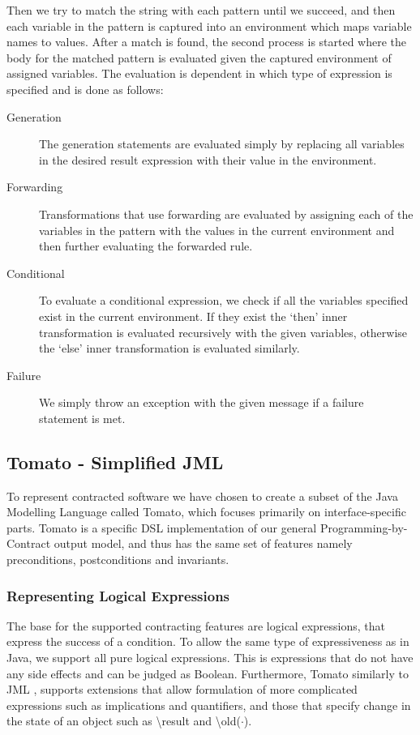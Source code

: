Then we try to match the string with each pattern until we succeed,
and then each variable in the pattern is captured into an environment
which maps variable names to values.
After a match is found, the second process is started where the body
for the matched pattern is evaluated given the captured environment of assigned variables.
The evaluation is dependent in which type of expression is specified
and is done as follows:

\begin{description}
  \item[Generation] The generation statements are evaluated simply
    by replacing all variables in the desired result expression with their 
    value in the environment. 
  \item[Forwarding] Transformations that use forwarding are evaluated by
    assigning each of the variables in the pattern with the values in the
    current environment and then further evaluating the forwarded rule.
  \item[Conditional] To evaluate a conditional expression, we check if all
    the variables specified exist in the current environment.
    If they exist the `then' inner transformation is evaluated recursively
    with the given variables, otherwise the `else' inner transformation
    is evaluated similarly.
  \item[Failure] We simply throw an exception with the given message
    if a failure statement is met.
\end{description}

\subsection{Tomato - Simplified JML}
\label{sub:Tomato-SimplifiedJML}

To represent contracted software we have chosen to create a subset of the
Java Modelling Language called Tomato,
which focuses primarily on interface-specific parts. 
Tomato is a specific DSL implementation of our general Programming-by-Contract output model, and thus has the same set of features
namely preconditions, postconditions and invariants.

\subsubsection{Representing Logical Expressions}
\label{sub:Representing Logical Expressions}
The base for the supported contracting features are logical expressions, that express
the success of a condition.
To allow the same type of expressiveness as in Java, we support all pure
logical expressions. This is expressions that do not have any side effects and can be judged as Boolean.
Furthermore, Tomato similarly to JML \cite{leavens2006design},
supports extensions that allow formulation of more complicated
expressions such as implications and quantifiers,
and those that specify change in the state of an object such as \textbackslash result
and \textbackslash old($\cdot$).


